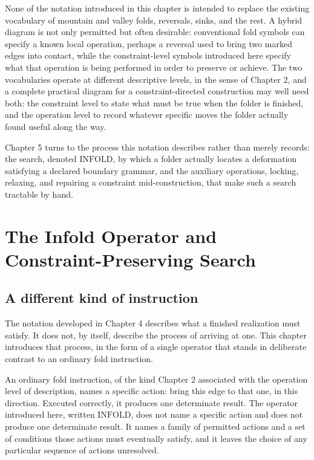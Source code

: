 \documentclass[11pt,oneside]{book}
\begin{document}
None of the notation introduced in this chapter is intended to replace
the existing vocabulary of mountain and valley folds, reversals, sinks,
and the rest. A hybrid diagram is not only permitted but often
desirable: conventional fold symbols can specify a known local
operation, perhaps a reversal used to bring two marked edges into
contact, while the constraint-level symbols introduced here specify what
that operation is being performed in order to preserve or achieve. The
two vocabularies operate at different descriptive levels, in the sense
of Chapter 2, and a complete practical diagram for a constraint-directed
construction may well need both: the constraint level to state what must
be true when the folder is finished, and the operation level to record
whatever specific moves the folder actually found useful along the way.

Chapter 5 turns to the process this notation describes rather than
merely records: the search, denoted \(\text{INFOLD}\), by which a folder
actually locates a deformation satisfying a declared boundary grammar,
and the auxiliary operations, locking, relaxing, and repairing a
constraint mid-construction, that make such a search tractable by hand.

\hypertarget{chapter-5.-the-infold-operator-and-constraint-preserving-search}{%
\chapter{The Infold Operator and Constraint-Preserving
Search}\label{chapter-5.-the-infold-operator-and-constraint-preserving-search}}

\hypertarget{a-different-kind-of-instruction}{%
\section{A different kind of
instruction}\label{a-different-kind-of-instruction}}

The notation developed in Chapter 4 describes what a finished
realization must satisfy. It does not, by itself, describe the process
of arriving at one. This chapter introduces that process, in the form of
a single operator that stands in deliberate contrast to an ordinary fold
instruction.

An ordinary fold instruction, of the kind Chapter 2 associated with the
operation level of description, names a specific action: bring this edge
to that one, in this direction. Executed correctly, it produces one
determinate result. The operator introduced here, written
\(\text{INFOLD}\), does not name a specific action and does not produce
one determinate result. It names a family of permitted actions and a set
of conditions those actions must eventually satisfy, and it leaves the
choice of any particular sequence of actions unresolved.
\end{document}
